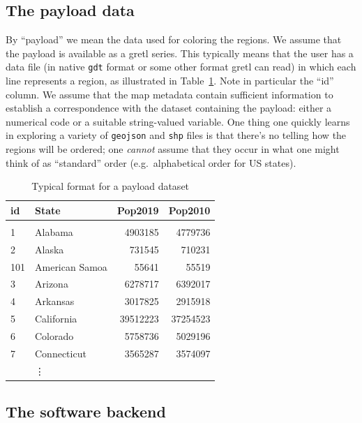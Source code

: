 \documentclass{article}
\begin{document}
\subsection{The payload data}
\label{sec:payload}

By ``payload'' we mean the data used for coloring the regions.  We
assume that the payload is available as a gretl series. This typically
means that the user has a data file (in native \texttt{gdt} format or
some other format gretl can read) in which each line represents a
region, as illustrated in Table~\ref{tab:payload}. Note in particular
the ``id'' column.  We assume that the map metadata contain sufficient
information to establish a correspondence with the dataset containing
the payload: either a numerical code or a suitable string-valued
variable.  One thing one quickly learns in exploring a variety of
\texttt{geojson} and \texttt{shp} files is that there's no telling how
the regions will be ordered; one \textit{cannot} assume that they
occur in what one might think of as ``standard'' order (e.g.\
alphabetical order for US states).

\begin{table}[htbp]
\begin{center}
\begin{tabular}{llrr}
  id	& State & Pop2019 & Pop2010 \\
  \hline \\ [-1.75ex]
  1	& Alabama	& 4903185	& 4779736  \\
  2     & Alaska	& 731545	& 710231   \\
  101   & American Samoa	& 55641	& 55519	  \\
  3	& Arizona	& 6278717	& 6392017  \\
  4	& Arkansas	& 3017825	& 2915918  \\
  5	& California	& 39512223	& 37254523 \\
  6	& Colorado	& 5758736	& 5029196  \\
  7	& Connecticut	& 3565287	& 3574097  \\
                & \vdots & \\
\end{tabular}
\end{center}
\caption{Typical format for a payload dataset}
\label{tab:payload}
\end{table}


\subsection{The software backend}
\label{sec:software}
\end{document}
